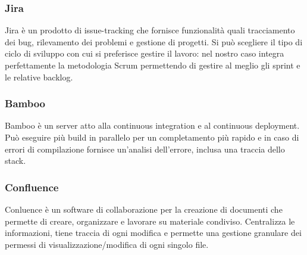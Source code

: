 \subsubsection{Jira}
Jira è un prodotto di issue-tracking che fornisce funzionalità quali tracciamento dei bug, rilevamento dei problemi e gestione di progetti. Si può scegliere il tipo di ciclo di sviluppo con cui si preferisce gestire il lavoro: nel nostro caso integra perfettamente la metodologia Scrum permettendo di gestire al meglio gli sprint e le relative backlog.
\subsubsection{Bamboo}
Bamboo è un server atto alla continuous integration e al continuous deployment. Può eseguire più build in parallelo per un completamento più rapido e in caso di errori di compilazione fornisce un'analisi dell'errore, inclusa una traccia dello stack.
\subsubsection{Confluence}
Conluence è un software di collaborazione per la creazione di documenti che permette di creare, organizzare e lavorare su materiale condiviso. Centralizza le informazioni, tiene traccia di ogni modifica e permette una gestione granulare dei permessi di visualizzazione/modifica di ogni singolo file.

